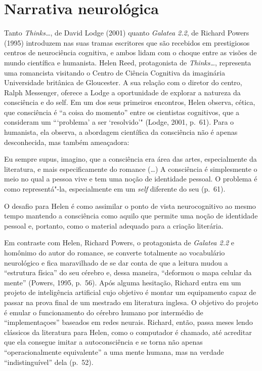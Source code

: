 \chapter{Narrativa neurológica}

Tanto \emph{Thinks\ldots{}}, de David Lodge (2001) quanto \emph{Galatea 2.2},
de Richard Powers (1995) introduzem nas suas tramas escritores que são
recebidos em prestigiosos centros de neurociência cognitiva, e ambos
lidam com o choque entre as visões de mundo científica e humanista.
Helen Reed, protagonista de \emph{Thinks\ldots{}}, representa uma romancista
visitando o Centro de Ciência Cognitiva da imaginária Universidade
britânica de Gloucester. A sua relação com o diretor do centro, Ralph
Messenger, oferece a Lodge a oportunidade de explorar a natureza da
consciência e do self. Em um dos seus primeiros encontros, Helen
observa, cética, que consciência é ``a coisa do momento'' entre os
cientistas cognitivos, que a consideram um ```problema' a ser
`resolvido'" (Lodge, 2001, p.~61). Para o humanista, ela observa, a
abordagem científica da consciência não é apenas desconhecida, mas
também ameaçadora:

Eu sempre supus, imagino, que a consciência era área das artes,
especialmente da literatura, e mais especificamente do romance (\ldots{}) A
consciência é simplesmente o meio no qual a pessoa vive e tem uma noção
de identidade pessoal. O problema é como representá"-la, especialmente em
um \emph{self} diferente do seu (p.~61).

O desafio para Helen é como assimilar o ponto de vista neurocognitivo ao
mesmo tempo mantendo a consciência como aquilo que permite uma noção de
identidade pessoal e, portanto, como o material adequado para a criação
literária.

Em contraste com Helen, Richard Powers, o protagonista de \emph{Galatea
2.2} e homônimo do autor do romance, se converte totalmente ao
vocabulário neurológico e fica maravilhado de se dar conta de que a
leitura mudou a ``estrutura física'' do seu cérebro e, dessa maneira,
``deformou o mapa celular da mente'' (Powers, 1995, p.~56). Após alguma
hesitação, Richard entra em um projeto de inteligência artificial cujo
objetivo é montar um equipamento capaz de passar na prova final de um
mestrado em literatura inglesa. O objetivo do projeto é emular o
funcionamento do cérebro humano por intermédio de ``implementaçoes''
baseados em redes neurais. Richard, então, passa meses lendo clássicos
da literatura para Helen, como o computador é chamado, até acreditar que
ela consegue imitar a autoconsciência e se torna não apenas
``operacionalmente equivalente'' a uma mente humana, mas na verdade
``indistinguível'' dela (p.~52).


